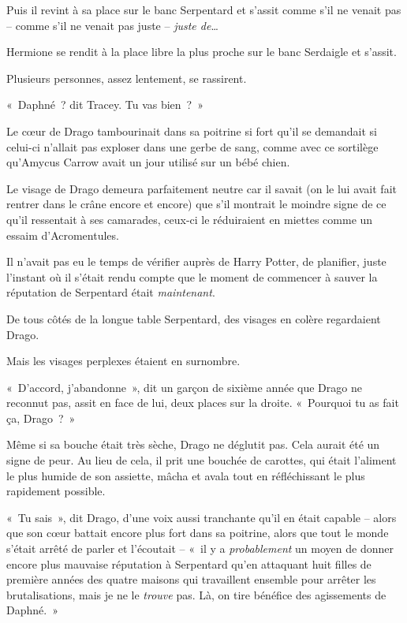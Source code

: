Puis il revint à sa place sur le banc Serpentard et s'assit comme s'il ne venait pas -- comme s'il ne venait pas juste -- \emph{juste de}…

Hermione se rendit à la place libre la plus proche sur le banc Serdaigle et s'assit.

Plusieurs personnes, assez lentement, se rassirent.

«~Daphné~? dit Tracey.
Tu vas bien~?~»

\later

Le cœur de Drago tambourinait dans sa poitrine si fort qu'il se demandait si celui-ci n'allait pas exploser dans une gerbe de sang, comme avec ce sortilège qu'Amycus Carrow avait un jour utilisé sur un bébé chien.

Le visage de Drago demeura parfaitement neutre car il savait (on le lui avait fait rentrer dans le crâne encore et encore) que s'il montrait le moindre signe de ce qu'il ressentait à ses camarades, ceux-ci le réduiraient en miettes comme un essaim d'Acromentules.

Il n'avait pas eu le temps de vérifier auprès de Harry Potter, de planifier, juste l'instant où il s'était rendu compte que le moment de commencer à sauver la réputation de Serpentard était \emph{maintenant}.

De tous côtés de la longue table Serpentard, des visages en colère regardaient Drago.

Mais les visages perplexes étaient en surnombre.

«~D'accord, j'abandonne~», dit un garçon de sixième année que Drago ne reconnut pas, assit en face de lui, deux places sur la droite.
«~Pourquoi tu as fait ça, Drago~?~»

Même si sa bouche était très sèche, Drago ne déglutit pas.
Cela aurait été un signe de peur.
Au lieu de cela, il prit une bouchée de carottes, qui était l'aliment le plus humide de son assiette, mâcha et avala tout en réfléchissant le plus rapidement possible.

«~Tu sais~», dit Drago, d'une voix aussi tranchante qu'il en était capable -- alors que son cœur battait encore plus fort dans sa poitrine, alors que tout le monde s'était arrêté de parler et l'écoutait -- «~il y a \emph{probablement} un moyen de donner encore plus mauvaise réputation à Serpentard qu'en attaquant huit filles de première années des quatre maisons qui travaillent ensemble pour arrêter les brutalisations, mais je ne le \emph{trouve} pas.
Là, on tire bénéfice des agissements de Daphné.~»

